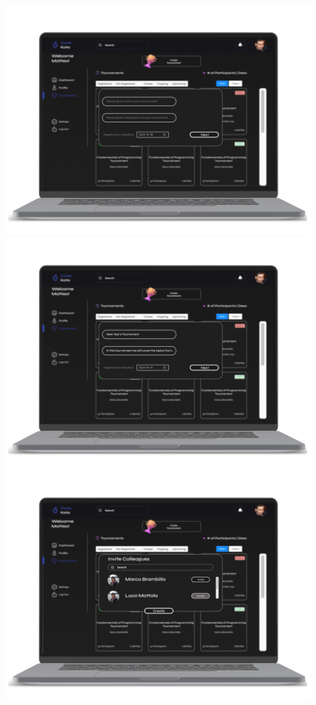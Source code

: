 \begin{center}
\includegraphics[scale=0.13]{Images/ui-ux/educator_create_tournament/educator_create_tournament_1.png}
\includegraphics[scale=0.13]{Images/ui-ux/educator_create_tournament/educator_create_tournament_2.png}
\includegraphics[scale=0.13]{Images/ui-ux/educator_create_tournament/educator_create_tournament_3.png}

\end{center}
